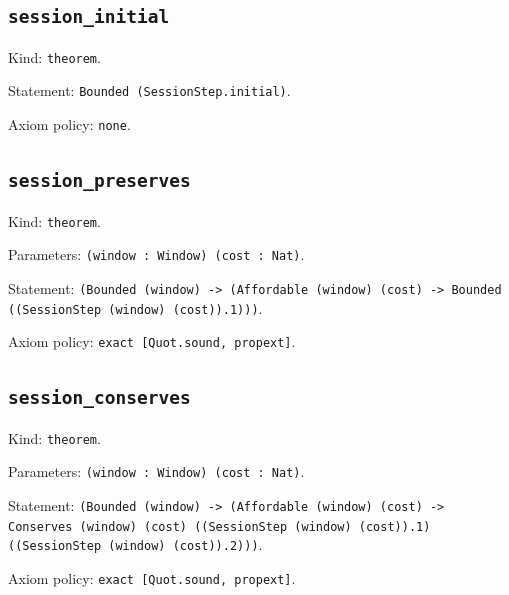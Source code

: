 \documentclass[11pt]{article}
\begin{document}
\subsection*{\texttt{session\_initial}}
\noindent Kind: \texttt{theorem}.\par
\noindent Statement: \texttt{Bounded (SessionStep.initial)}.\par
\noindent Axiom policy: \texttt{none}.\par
\subsection*{\texttt{session\_preserves}}
\noindent Kind: \texttt{theorem}.\par
\noindent Parameters: \texttt{(window : Window) (cost : Nat)}.\par
\noindent Statement: \texttt{(Bounded (window) -> (Affordable (window) (cost) -> Bounded ((SessionStep (window) (cost)).1)))}.\par
\noindent Axiom policy: \texttt{exact [Quot.sound, propext]}.\par
\subsection*{\texttt{session\_conserves}}
\noindent Kind: \texttt{theorem}.\par
\noindent Parameters: \texttt{(window : Window) (cost : Nat)}.\par
\noindent Statement: \texttt{(Bounded (window) -> (Affordable (window) (cost) -> Conserves (window) (cost) ((SessionStep (window) (cost)).1) ((SessionStep (window) (cost)).2)))}.\par
\noindent Axiom policy: \texttt{exact [Quot.sound, propext]}.\par
\end{document}

